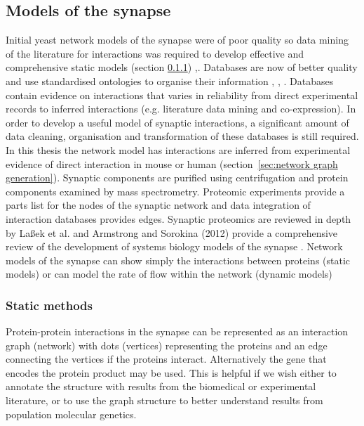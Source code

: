 \subsection{Models of the synapse}
\label{sec:models of the synapse}
Initial yeast network models of the synapse were of poor quality so data mining of the literature for interactions was required to develop effective and comprehensive static models (section \ref{sec:static models}) \cite{pocklington2006proteomes},\cite{armstrong2012evolution}. Databases are now of better quality and use standardised ontologies to organise their information \cite{brazma2006standards}, \cite{hermjakob2004hupo}, \cite{kerrien2007broadening}. Databases contain evidence on interactions that varies in reliability from direct experimental records to inferred interactions (e.g. literature data mining and co-expression). In order to develop a useful model of synaptic interactions, a significant amount of data cleaning, organisation and transformation of these databases is still required. In this thesis the network model has interactions are inferred from experimental evidence of direct interaction in mouse or human (section~\ref{sec:network graph generation}). Synaptic components are purified using centrifugation and protein components examined by mass spectrometry. Proteomic experiments provide a parts list for the nodes of the synaptic network and data integration of interaction databases provides edges.  Synaptic proteomics are reviewed in depth by La{\ss}ek et al. \cite{lassek2014proteome} and Armstrong and Sorokina (2012) provide a comprehensive review of the development of systems biology models of the synapse \cite{armstrong2012evolution}. Network models of the synapse can show simply the interactions between proteins (static models) or can model the rate of flow within the network (dynamic models)

\subsubsection{Static methods}
\label{sec:static models}

Protein-protein interactions in the synapse can be represented as an interaction graph (network) with dots (vertices) representing the proteins and an edge connecting the vertices if the proteins interact. Alternatively the gene that encodes the protein product may be used. This is helpful if we wish either to annotate the structure with results from the biomedical or experimental literature, or to use the graph structure to better understand results from population molecular genetics. 

